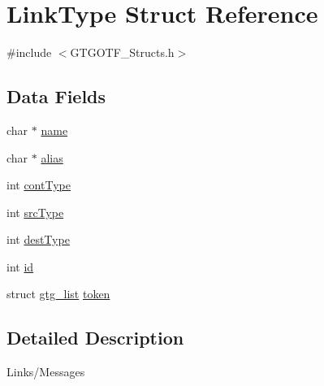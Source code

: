 \hypertarget{structLinkType}{\section{Link\-Type Struct Reference}
\label{structLinkType}
}


{\ttfamily \#include $<$G\-T\-G\-O\-T\-F\-\_\-\-Structs.\-h$>$}

\subsection*{Data Fields}
\begin{DoxyCompactItemize}
\item 
char $\ast$ \hyperlink{structLinkType_a876188b4529f34bbfb54bf0f7b102da0}{name}
\item 
char $\ast$ \hyperlink{structLinkType_a86ee7c3fde6e9bc60465218437b2fb93}{alias}
\item 
int \hyperlink{structLinkType_a3020cf7752917aed0f7193431ec4c81b}{cont\-Type}
\item 
int \hyperlink{structLinkType_a210a16b6927e61d4f8903a6170c40a4d}{src\-Type}
\item 
int \hyperlink{structLinkType_a9c7024c680fee0ec1a8658be033bbadb}{dest\-Type}
\item 
int \hyperlink{structLinkType_ab3ba87c081b571030116c61f4f45e67a}{id}
\item 
struct \hyperlink{structgtg__list}{gtg\-\_\-list} \hyperlink{structLinkType_a8430d62765b8301d38b63ef8d52c14dd}{token}
\end{DoxyCompactItemize}


\subsection{Detailed Description}
Links/\-Messages 

